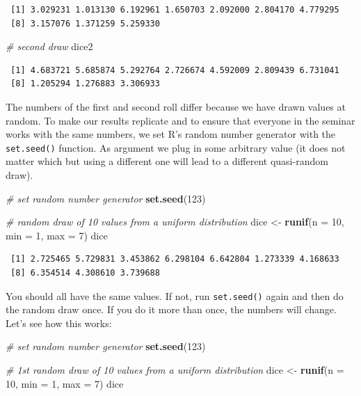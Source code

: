 \documentclass[]{article}
\newenvironment{Shaded}{\begin{snugshade}}{\end{snugshade}}
\newcommand{\CommentTok}[1]{\textcolor[rgb]{0.56,0.35,0.01}{\textit{#1}}}
\newcommand{\DataTypeTok}[1]{\textcolor[rgb]{0.13,0.29,0.53}{#1}}
\newcommand{\DecValTok}[1]{\textcolor[rgb]{0.00,0.00,0.81}{#1}}
\newcommand{\KeywordTok}[1]{\textcolor[rgb]{0.13,0.29,0.53}{\textbf{#1}}}
\newcommand{\NormalTok}[1]{#1}
\newcommand{\StringTok}[1]{\textcolor[rgb]{0.31,0.60,0.02}{#1}}
\begin{document}
\begin{verbatim}
 [1] 3.029231 1.013130 6.192961 1.650703 2.092000 2.804170 4.779295
 [8] 3.157076 1.371259 5.259330
\end{verbatim}

\begin{Shaded}
\begin{Highlighting}[]
\CommentTok{# second draw}
\NormalTok{dice2}
\end{Highlighting}
\end{Shaded}

\begin{verbatim}
 [1] 4.683721 5.685874 5.292764 2.726674 4.592009 2.809439 6.731041
 [8] 1.205294 1.276883 3.306933
\end{verbatim}

The numbers of the first and second roll differ because we have drawn values at random. To make our results replicate and to ensure that everyone in the seminar works with the same numbers, we set R's random number generator with the \texttt{set.seed()} function. As argument we plug in some arbitrary value (it does not matter which but using a different one will lead to a different quasi-random draw).

\begin{Shaded}
\begin{Highlighting}[]
\CommentTok{# set random number generator}
\KeywordTok{set.seed}\NormalTok{(}\DecValTok{123}\NormalTok{)}

\CommentTok{# random draw of 10 values from a uniform distribution}
\NormalTok{dice <-}\StringTok{ }\KeywordTok{runif}\NormalTok{(}\DataTypeTok{n =} \DecValTok{10}\NormalTok{, }\DataTypeTok{min =} \DecValTok{1}\NormalTok{, }\DataTypeTok{max =} \DecValTok{7}\NormalTok{)}
\NormalTok{dice}
\end{Highlighting}
\end{Shaded}

\begin{verbatim}
 [1] 2.725465 5.729831 3.453862 6.298104 6.642804 1.273339 4.168633
 [8] 6.354514 4.308610 3.739688
\end{verbatim}

You should all have the same values. If not, run \texttt{set.seed()} again and then do the random draw once. If you do it more than once, the numbers will change. Let's see how this works:

\begin{Shaded}
\begin{Highlighting}[]
\CommentTok{# set random number generator}
\KeywordTok{set.seed}\NormalTok{(}\DecValTok{123}\NormalTok{)}

\CommentTok{# 1st random draw of 10 values from a uniform distribution}
\NormalTok{dice <-}\StringTok{ }\KeywordTok{runif}\NormalTok{(}\DataTypeTok{n =} \DecValTok{10}\NormalTok{, }\DataTypeTok{min =} \DecValTok{1}\NormalTok{, }\DataTypeTok{max =} \DecValTok{7}\NormalTok{)}
\NormalTok{dice}
\end{Highlighting}
\end{Shaded}
\end{document}
